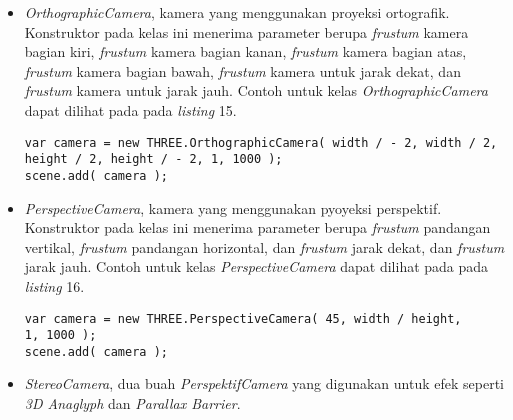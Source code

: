 \documentclass[a4paper,twoside]{article}
\begin{document}
\begin{enumerate}
\begin{itemize}
\begin{itemize}
	\item{\it OrthographicCamera}, kamera yang menggunakan proyeksi ortografik. Konstruktor pada kelas ini menerima parameter berupa {\it frustum} kamera bagian kiri, {\it frustum} kamera bagian kanan, {\it frustum} kamera bagian atas, {\it frustum} kamera bagian bawah, {\it frustum} kamera untuk jarak dekat, dan {\it frustum} kamera untuk jarak jauh. Contoh untuk kelas {\it OrthographicCamera} dapat dilihat pada pada {\it listing} 15.
\begin{lstlisting}[caption={Contoh instansiasi kelas {\it OrthographicCamera}},captionpos=b]
var camera = new THREE.OrthographicCamera( width / - 2, width / 2, 
height / 2, height / - 2, 1, 1000 );
scene.add( camera );
\end{lstlisting}
	
	\item {\it PerspectiveCamera}, kamera yang menggunakan pyoyeksi perspektif. Konstruktor pada kelas ini menerima parameter berupa {\it frustum} pandangan vertikal, {\it frustum} pandangan horizontal, dan {\it frustum} jarak dekat, dan {\it frustum} jarak jauh. Contoh untuk kelas {\it PerspectiveCamera} dapat dilihat pada pada {\it listing} 16.
\begin{lstlisting}[caption={Contoh instansiasi kelas {\it PerspectiveCamera}},captionpos=b]
var camera = new THREE.PerspectiveCamera( 45, width / height, 
1, 1000 );
scene.add( camera );
\end{lstlisting}
	
	\item {\it StereoCamera}, dua buah {\it PerspektifCamera} yang digunakan untuk efek seperti {\it 3D Anaglyph} dan {\it Parallax Barrier}.

	\end{itemize}
	

\end{itemize}
\end{enumerate}
\end{document}
